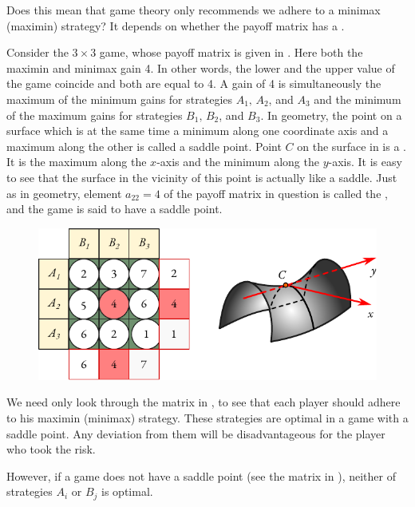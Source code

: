 Does this mean that game theory only recommends we adhere to
a minimax (maximin) strategy? It depends on whether the payoff matrix
has a .

 Consider the $3 \times 3$ game, whose payoff matrix is given in . Here both the maximin and minimax gain 4. In other words, the lower and the upper value of the game coincide and both are equal to 4. A gain of 4 is simultaneously the maximum of
the minimum gains for strategies $A_{1}, \, A_{2}$, and $A_{3}$ and the minimum of the maximum gains for strategies $B_{1}, \, B_{2}$, and $B_{3}$. In geometry, the point on a surface which is at the same time a minimum along one coordinate axis and a maximum along the other is called a saddle point. Point $C$ on the surface in  is a . It is the maximum along the $x$-axis and the minimum along the $y$-axis. It is easy to see that the surface in the vicinity of this point is actually like a saddle. Just as in geometry, element $a_{22} = 4$ of the payoff matrix in question is called the
, and the game is said to have a saddle point.

 \begin{figure}[!h]
 \centering
 \includegraphics[width=\textwidth]{figures/saddle-point.pdf}
 \end{figure}
We need only look through the matrix in , to see that each player should adhere to his maximin (minimax) strategy. These strategies
are optimal in a game with a saddle point. Any deviation from them will
be disadvantageous for the player who took the risk.

However, if a game does not have a saddle point (see the matrix in
), neither of strategies $A_{i}$ or $B_{j}$ is optimal.

